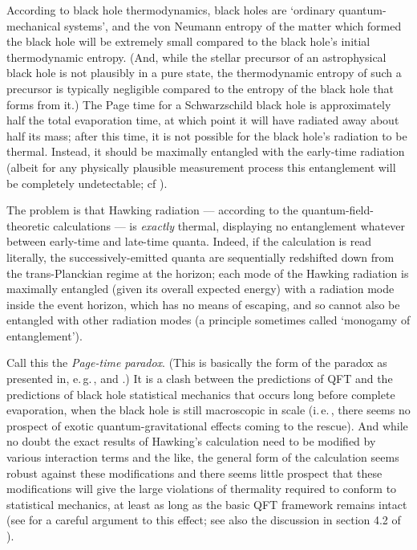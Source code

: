 \documentclass[12pt]{article}
\newcommand{\iec}{\mbox{i.\,e.\,}}
\newcommand{\egc}{\mbox{e.\,g.\,}}
\begin{document}
According to black hole thermodynamics, black holes are `ordinary quantum-mechanical systems', and the von Neumann entropy of the matter which formed the black hole will be extremely small compared to the black hole's initial thermodynamic entropy. (And, while the stellar precursor of an astrophysical black hole is not plausibly in a pure state, the thermodynamic entropy of such a precursor is typically negligible compared to the entropy of the black hole that forms from it.) The Page time for a Schwarzschild black hole is approximately half the total evaporation time, at which point it will have radiated away about half its mass; after this time, it is not possible for the black hole's radiation to be thermal. Instead, it should be maximally entangled with the early-time radiation (albeit for any physically plausible measurement process this entanglement will be completely undetectable; cf ).

The problem is that Hawking radiation --- according to the quantum-field-theoretic calculations --- is \emph{exactly} thermal, displaying no entanglement whatever between early-time and late-time quanta. Indeed, if the calculation is read literally, the successively-emitted quanta are sequentially redshifted down from the trans-Planckian regime at the horizon; each mode of the Hawking radiation is maximally entangled (given its overall expected energy) with a radiation mode inside the event horizon, which has no means of escaping, and so cannot also be entangled with other radiation modes (a principle sometimes called `monogamy of entanglement').

Call this the \emph{Page-time paradox}. (This is basically the form of the paradox as presented in, \egc,  and .) It is a clash between the predictions of QFT and the predictions of black hole statistical mechanics that occurs long before complete evaporation, when the black hole is still macroscopic in scale (\iec, there seems no prospect of exotic quantum-gravitational effects coming to the rescue). And while no doubt the exact results of Hawking's calculation need to be modified by various interaction terms and the like, the general form of the calculation seems robust against these modifications and there seems little prospect that these modifications will give the large violations of thermality required to conform to statistical mechanics, at least as long as the basic QFT framework remains intact (see  for a careful argument to this effect; see also the discussion in section 4.2 of ).
\end{document}
